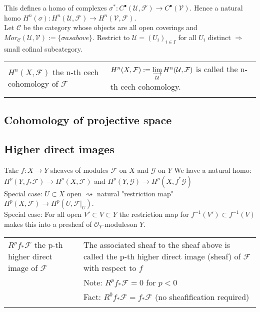 \documentclass[a4paper, 12pt]{article}
\newcommand{\ca}[1]{\mathcal{#1}}
\newcommand{\caf}{\mathcal{F}}
\newcommand{\cag}{\mathcal{G}}
\newcommand{\cau}{\mathcal{U}}
\newcommand{\oymods}{$\mathcal{O}_Y$-modules}
\begin{document}
This defines a homo of complexes $\sigma^*: C^{\bullet}(\cau, \caf) \longrightarrow C^{\bullet}(\ca{V})$. Hence a natural homo $H^n(\sigma) : H^n(\cau , \caf) \longrightarrow H^n( \ca{V} , \caf)$.\\

Let $\ca{C}$ be the category whose objects are all open coverings and $Mor_{\ca{C}}(\cau, \ca{V}) := \{ \sigma as above\}$. Restrict to $\cau = (U_i)_{i \in I}$ for all $U_i$ distinct $\Longrightarrow$ small cofinal subcategory.\\

\begin{longtable}{p{}  p{} }

  $H^n(X,\caf)$ the n-th cech cohomology of $\caf$ & $H^n(X, \caf ) := \varinjlim\limits_{\cau} H^n(\cau , \caf)$ is called the n-th cech cohomology.\\


  &\\
\end{longtable}

  


  \subsection{Cohomology of projective space}

  \subsection{Higher direct images}

  Take $f:X \rightarrow Y$ sheaves of modules $\caf$ on $X$ and $\cag$ on $Y$
  We have a natural homo: $H^p(Y,f_* \caf) \rightarrow H^p(X, \caf)$ and $H^p(Y, \cag) \rightarrow H^p(X, f^* \cag)$
  \\

  Special case: $U \subset X$ open $\rightsquigarrow$ natural "restriction map" $H^p(X, \caf)\longrightarrow H^p(U, \caf |_U)$.\\

  Special case: For all open $V' \subset V \subset Y$ the restriction map  for $f^{-1}(V') \subset f^{-1}(V)$ makes this into a presheaf of \oymods on $Y$.\\

  
  
\begin{longtable}{p{}  p{} }

  $R^pf_*\caf$ the p-th higher direct image of $\caf $ & The associated sheaf to the sheaf above is called the p-th higher direct image (sheaf) of $\caf$ with respect to $f$ \\
  &Note: $R^pf_*\caf = 0$ for $p<0$\\
  &Fact: $R^0f_*\caf = f_*\caf$  (no sheafification required)\\
  
  &\\


\end{longtable}
\end{document}
